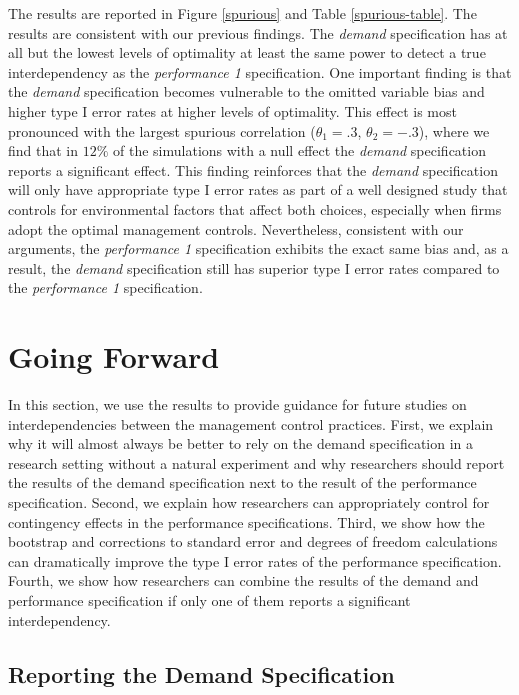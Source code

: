 \documentclass[12pt]{article}
\begin{document}
The results are reported in Figure \ref{spurious} and Table \ref{spurious-table}. The results are consistent with our previous findings. The \emph{demand} specification has at all but the lowest levels of optimality at least the same power to detect a true interdependency as the \emph{performance 1} specification. One important finding is that the \emph{demand} specification becomes vulnerable to the omitted variable bias and higher type I error rates at higher levels of optimality. This effect is most pronounced with the largest spurious correlation (\(\theta_1 = .3\), \(\theta_2 = -.3\)), where we find that in $12\%$ of the simulations with a null effect the \emph{demand} specification reports a significant effect. This finding reinforces that the \emph{demand} specification will only have appropriate type I error rates as part of a well designed study that controls for environmental factors that affect both choices, especially when firms adopt the optimal management controls. Nevertheless, consistent with our arguments, the \emph{performance 1} specification exhibits the exact same bias and, as a result, the \emph{demand} specification still has superior type I error rates compared to the \emph{performance 1} specification.

\section{Going Forward}

In this section, we use the results to provide guidance for future studies on interdependencies between the management control practices. First, we explain why it will almost always be better to rely on the demand specification in a research setting without a natural experiment and why researchers should report the results of the demand specification next to the result of the performance specification. Second, we explain how researchers can appropriately control for contingency effects in the performance specifications. Third, we show how the bootstrap and corrections to standard error and degrees of freedom calculations can dramatically improve the type I error rates of the performance specification. Fourth, we show how researchers can combine the results of the demand and performance specification if only one of them reports a significant interdependency.

\subsection{Reporting the Demand Specification}
\end{document}

